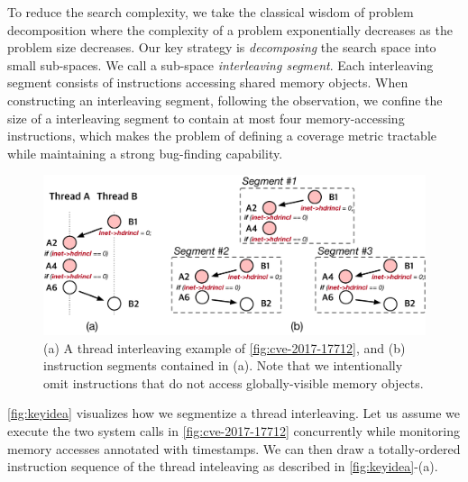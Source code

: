 %
To reduce the search complexity, we take the classical wisdom of
problem decomposition where the complexity of a problem exponentially
decreases as the problem size decreases.
%
Our key strategy is \textit{decomposing} the search space into small
sub-spaces. We call a sub-space \textit{interleaving segment}.
%
Each interleaving segment consists of instructions accessing 
shared memory objects.
%
%
When constructing an interleaving segment, following the observation, 
we confine the size of a interleaving segment 
to contain at most four memory-accessing instructions,
which makes the problem of defining a coverage metric tractable while maintaining a strong bug-finding capability.


%
\begin{figure}[t]
  \centering
  \includegraphics[width=0.99\linewidth]{fig/intuition.pdf}
  \caption{(a) A thread interleaving example of
    \autoref{fig:cve-2017-17712}, and (b) instruction segments
    contained in (a).  Note that we intentionally omit instructions
    that do not access globally-visible memory objects.}
  \label{fig:keyidea}
\end{figure}
%
\autoref{fig:keyidea} visualizes how we segmentize a thread
interleaving.
%
Let us assume we execute the two system calls in
\autoref{fig:cve-2017-17712} concurrently while monitoring memory
accesses annotated with timestamps.
%
We can then draw a totally-ordered instruction sequence of the thread
inteleaving as described in \autoref{fig:keyidea}-(a).



